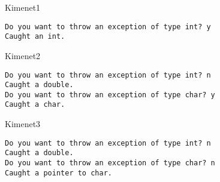 \documentclass[usenames,dvipsnames,aspectratio=169]{beamer}
\begin{document}
\begin{frame}
    \begin{exampleblock}{}
        \footnotesize
        
    \end{exampleblock}
\end{frame}

\begin{frame}
    \begin{exampleblock}{}
        \vspace{-.2cm}
        \fontsize{8}{9} \selectfont
        
        \vspace{-.2cm}
    \end{exampleblock}
\end{frame}

\begin{frame}[fragile]
    \begin{block}{Kimenet1}
        \vspace{-.45cm}
        \small
        \begin{verbatim}
Do you want to throw an exception of type int? y
Caught an int.
\end{verbatim}
    \vspace{-.45cm}
    \end{block}
    \begin{block}{Kimenet2}
        \vspace{-.45cm}
        \small
        \begin{verbatim}
Do you want to throw an exception of type int? n
Caught a double.
Do you want to throw an exception of type char? y
Caught a char.
\end{verbatim}
    \vspace{-.45cm}
    \end{block}
    \begin{block}{Kimenet3}
        \vspace{-.45cm}
        \small
        \begin{verbatim}
Do you want to throw an exception of type int? n
Caught a double.
Do you want to throw an exception of type char? n
Caught a pointer to char.
\end{verbatim}
    \vspace{-.45cm}
    \end{block}
\end{frame}
\end{document}
